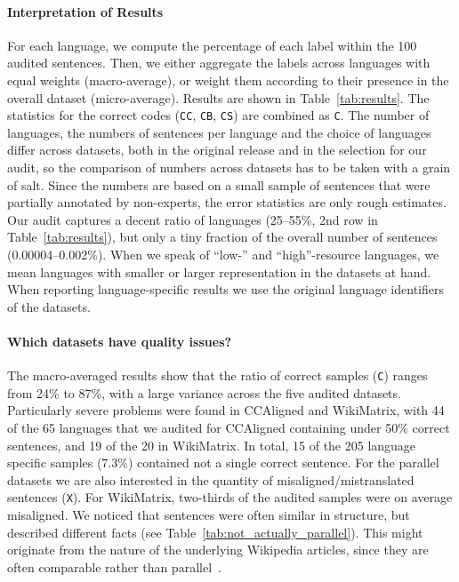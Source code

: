 \paragraph{Interpretation of Results}
For each language, we compute the percentage of each label within the 100 audited sentences.
Then, we either aggregate the labels across languages with equal weights (macro-average), or weight them according to their presence in the overall dataset (micro-average). Results are shown in Table~\ref{tab:results}. The statistics for the correct codes (\texttt{CC}, \texttt{CB}, \texttt{CS}) are combined as \texttt{C}.
The number of languages, the numbers of sentences per language and the choice of languages differ across datasets, both in the original release and in the selection for our audit, so the comparison of numbers across datasets has to be taken with a grain of salt. Since the numbers are based on a small sample of sentences that were partially annotated by non-experts, the error statistics are only rough estimates.
Our audit captures a decent ratio of languages (25--55\%, 2nd row in Table~\ref{tab:results}), but only a tiny fraction of the overall number of sentences (0.00004--0.002\%).
When we speak of ``low-'' and ``high''-resource languages, we mean languages with smaller or larger representation in the datasets at hand. When reporting language-specific results we use the original language identifiers of the datasets.



\paragraph{Which datasets have quality issues?}

The macro-averaged results show that the ratio of correct samples (\texttt{C}) ranges from 24\% to 87\%, with a large variance across the five audited datasets.
Particularly severe problems were found in CCAligned and WikiMatrix, with 44 of the 65 languages that we audited for CCAligned containing under 50\% correct sentences, and 19 of the 20 in WikiMatrix. In total, 15 of the 205 language specific samples (7.3\%) contained not a single correct sentence.
For the parallel datasets we are also interested in the quantity of misaligned/mistranslated sentences (\texttt{X}). For WikiMatrix, two-thirds of the audited samples were on average misaligned. We noticed that sentences were often similar in structure, but described different facts (see Table~\ref{tab:not_actually_parallel}). This might originate from the nature of the underlying Wikipedia articles, since they are often comparable rather than parallel~\citep{schwenk-etal-2021-wikimatrix}.

